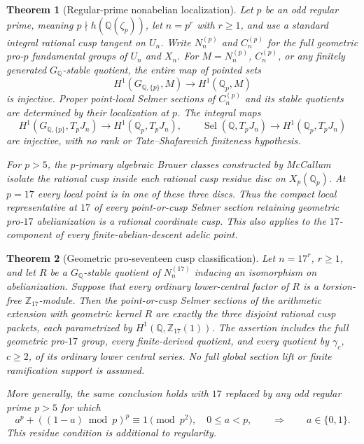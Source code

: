 \documentclass[11pt]{article}
\newcommand{\Q}{\mathbb Q}
\newcommand{\Z}{\mathbb Z}
\newcommand{\Sel}{\operatorname{Sel}}
\newtheorem{theorem}{Theorem}[section]
\theoremstyle{definition}
\begin{document}
\begin{theorem}[Regular-prime nonabelian localization]
\label{thm:regular-nonabelian-localization-intro}
Let $p$ be an odd regular prime, meaning $p\nmid h(\Q(\zeta_p))$,
let $n=p^r$ with $r\ge1$, and use a standard integral rational cusp
tangent on $U_n$. Write $N_n^{(p)}$ and $C_n^{(p)}$ for the full
geometric pro-$p$ fundamental groups of $U_n$ and $X_n$.
For $M=N_n^{(p)}$, $C_n^{(p)}$, or any finitely generated
$G_\Q$-stable quotient, the entire map of pointed sets
\[
 H^1(G_{\Q,\{p\}},M)\longrightarrow H^1(\Q_p,M)
\]
is injective. Proper point-local Selmer sections of $C_n^{(p)}$
and its stable quotients are determined by their localization at $p$.
The integral maps
\[
 H^1(G_{\Q,\{p\}},T_pJ_n)\longrightarrow H^1(\Q_p,T_pJ_n),
 \qquad \Sel(\Q,T_pJ_n)\longrightarrow H^1(\Q_p,T_pJ_n)
\]
are injective, with no rank or Tate--Shafarevich finiteness hypothesis.

For $p>5$, the $p$-primary algebraic Brauer classes constructed by
McCallum isolate the rational cusp inside each rational cusp residue
disc on $X_p(\Q_p)$. At $p=17$ every local point is in one of these
three discs. Thus the compact local representative at $17$ of every
point-or-cusp Selmer section retaining geometric pro-$17$
abelianization is a rational coordinate cusp. This also applies to
the $17$-component of every finite-abelian-descent adelic point.
\end{theorem}

\begin{theorem}[Geometric pro-seventeen cusp classification]
\label{thm:proseventeen-intro}
Let $n=17^r$, $r\ge1$, and let $R$ be a $G_\Q$-stable quotient of
$N_n^{(17)}$ inducing an isomorphism on abelianization. Suppose that
every ordinary lower-central factor of $R$ is a torsion-free
$\Z_{17}$-module. Then the point-or-cusp Selmer sections of the
arithmetic extension with geometric kernel $R$ are exactly the
three disjoint rational cusp packets, each parametrized by
$H^1(\Q,\Z_{17}(1))$. The assertion includes the full geometric
pro-$17$ group, every finite-derived quotient, and every quotient
by $\gamma_c$, $c\ge2$, of its ordinary lower central series.
No full global section lift or finite ramification support is assumed.

More generally, the same conclusion holds with $17$ replaced by any
odd regular prime $p>5$ for which
\[
 a^p+((1-a)\bmod p)^p\equiv1\pmod {p^2},\quad 0\le a<p,
 \qquad\Longrightarrow\qquad a\in\{0,1\}.
\]
This residue condition is additional to regularity.
\end{theorem}
\end{document}
